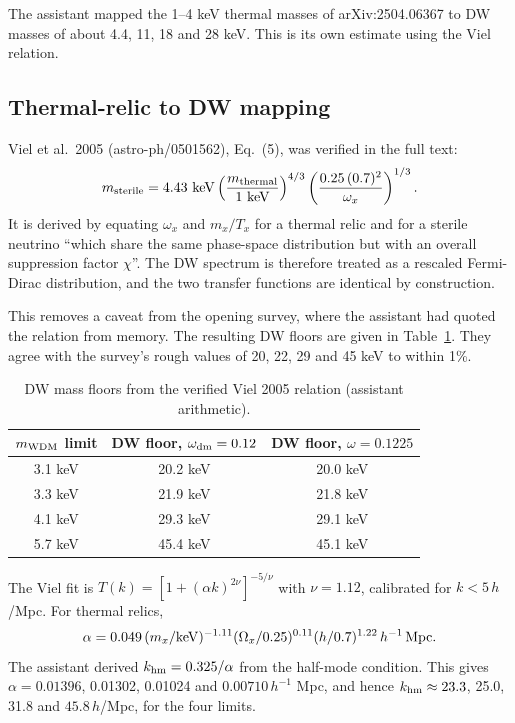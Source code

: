 \documentclass[11pt,a4paper]{article}
\begin{document}
The assistant mapped the 1--4 keV thermal masses of arXiv:2504.06367 to DW masses of about 4.4, 11, 18 and 28 keV. This is its own estimate using the Viel relation.

\subsection{Thermal-relic to DW mapping}
Viel et al.\ 2005 (astro-ph/0501562), Eq.~(5), was verified in the full text:
\[
m_{\rm sterile}=4.43\ {\rm keV}\left(\frac{m_{\rm thermal}}{1\ {\rm keV}}\right)^{4/3}\left(\frac{0.25\,(0.7)^2}{\omega_x}\right)^{1/3}.
\]
It is derived by equating $\omega_x$ and $m_x/T_x$ for a thermal relic and for a sterile neutrino ``which share the same phase-space distribution but with an overall suppression factor $\chi$''. The DW spectrum is therefore treated as a rescaled Fermi-Dirac distribution, and the two transfer functions are identical by construction.

This removes a caveat from the opening survey, where the assistant had quoted the relation from memory. The resulting DW floors are given in Table~\ref{tab:floors}. They agree with the survey's rough values of 20, 22, 29 and 45 keV to within 1\%.

\begin{table}[h]
\centering
\begin{tabular}{ccc}
\toprule
$m_{\rm WDM}$ limit & DW floor, $\omega_{\rm dm}=0.12$ & DW floor, $\omega=0.1225$ \\
\midrule
3.1 keV & 20.2 keV & 20.0 keV \\
3.3 keV & 21.9 keV & 21.8 keV \\
4.1 keV & 29.3 keV & 29.1 keV \\
5.7 keV & 45.4 keV & 45.1 keV \\
\bottomrule
\end{tabular}
\caption{DW mass floors from the verified Viel 2005 relation (assistant arithmetic).}
\label{tab:floors}
\end{table}

The Viel fit is $T(k)=[1+(\alpha k)^{2\nu}]^{-5/\nu}$ with $\nu=1.12$, calibrated for $k<5\,h$/Mpc. For thermal relics,
\[
\alpha=0.049\,(m_x/{\rm keV})^{-1.11}(\Omega_x/0.25)^{0.11}(h/0.7)^{1.22}\,h^{-1}\,{\rm Mpc}.
\]
The assistant derived $k_{\rm hm}=0.325/\alpha$ from the half-mode condition. This gives $\alpha=0.01396$, 0.01302, 0.01024 and $0.00710\,h^{-1}$ Mpc, and hence $k_{\rm hm}\approx23.3$, 25.0, 31.8 and $45.8\,h$/Mpc, for the four limits.
\end{document}

